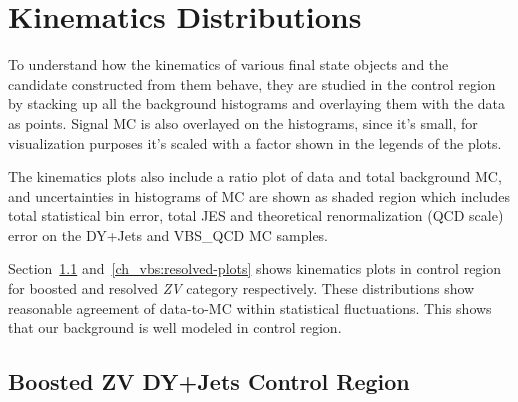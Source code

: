 \clearpage
\section{Kinematics Distributions}

To understand how the kinematics of various final state objects and
the candidate constructed from them behave, they are studied in the control
region by stacking up all the background histograms and
overlaying them with the data as points.
Signal \gls{MC} is also overlayed on the histograms, since it's small,
for visualization purposes it's scaled with a factor shown in
the legends of the plots.

The kinematics plots also include a ratio plot of data and total background
\gls{MC}, and uncertainties in histograms of \gls{MC} are shown as shaded region
which includes total statistical bin error, total \gls{JES} and
theoretical renormalization (QCD scale) error on the DY+Jets and VBS\_QCD \gls{MC} samples.

Section~\ref{ch_vbs:boosted-plots} and~\ref{ch_vbs:resolved-plots}
shows kinematics plots in control region for boosted and
resolved \textit{ZV} category respectively. These distributions show reasonable
agreement of data-to-\gls{MC} within statistical fluctuations.
This shows that our background is well modeled in control region.

\clearpage{}
\subsection{
  Boosted ZV DY+Jets Control Region
}\label{ch_vbs:boosted-plots}

